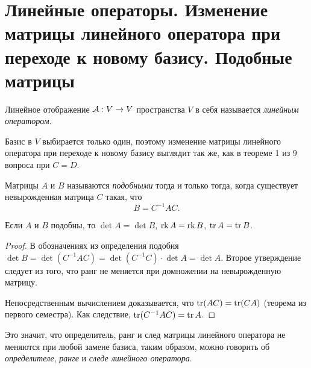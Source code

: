 \section{Линейные операторы. Изменение матрицы линейного оператора при переходе к новому базису. Подобные матрицы}

\begin{definition}
    Линейное отображение $\mathcal{A}: V \to V$ пространства $V$ в себя называется \textit{линейным оператором}.
\end{definition}

Базис в $V$ выбирается только один, поэтому изменение матрицы линейного оператора при переходе к новому базису выглядит так же, как в теореме 1 из 9 вопроса при $C = D$.

\begin{definition}
    Матрицы $A$ и $B$ называются \textit{подобными} тогда и только тогда, когда существует невырожденная матрица $C$ такая, что
    \[
        B = C^{-1}AC.
    \]
\end{definition}

\begin{proposal}
    Если $A$ и $B$ подобны, то $\det A = \det B$, $\operatorname{rk} A = \operatorname{rk} B$, $\operatorname{tr} A = \operatorname{tr} B$.
\end{proposal}

\begin{proof}
    В обозначениях из определения подобия $\det B = \det(C^{-1}AC) = \det(C^{-1}C) \cdot \det A = \det A$. Второе утверждение следует из того, что ранг не меняется при домножении на невырожденную матрицу.

    Непосредственным вычислением доказывается, что $\operatorname{tr}(AC) = \operatorname{tr}(CA)$ (теорема из первого семестра). Как следствие, $\operatorname{tr}(C^{-1}AC) = \operatorname{tr} A$.
\end{proof}

Это значит, что определитель, ранг и след матрицы линейного оператора не меняются при любой замене базиса, таким образом, можно говорить об \textit{определителе}, \textit{ранге} и \textit{следе линейного оператора}.

